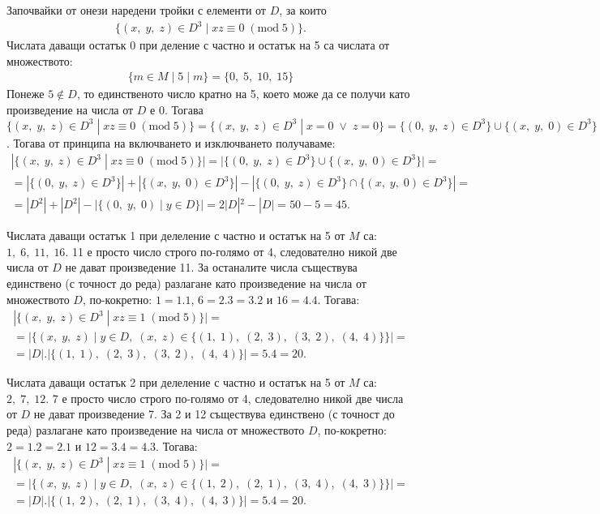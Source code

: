 \documentclass[a4paper, 12pt, oneside]{article}
\begin{document}
Започвайки от онези наредени тройки с елементи от $D$, за които
\begin{align*}
    \{(x, \; y, \; z) \in D^3 \; | \; xz \equiv 0 \; (\mathrm{mod} \; 5)\}.
\end{align*}
Числата даващи остатък 0 при деление с частно и остатък на 5 са числата от множеството:
\begin{align*}
    \{m \in M \; | \; 5 \mid m \} = \{0, \; 5, \; 10, \; 15\}
\end{align*}
Понеже $5 \notin D$, то единственото число кратно на 5, което може да се получи като произведение на числа от $D$ е 0.
Тогава
$\{(x, \; y, \; z) \in D^3 \; | \; xz \equiv 0 \; (\mathrm{mod} \; 5)\}
= \{(x, \; y, \; z) \in D^3 \; | \; x = 0 \; \lor \; z = 0 \} = \{(0, \; y, \; z) \in D^3\} \cup \{(x, \; y, \; 0) \in D^3\}$.
Тогава от принципа на включването и изключването получаваме:
\begin{align*}
|\{(x, \; y, \; z) \in D^3 \; | \; xz \equiv 0 \; (\mathrm{mod} \; 5)\}| = |\{(0, \; y, \; z) \in D^3\} \cup \{(x, \; y, \; 0) \in D^3\}| = \\
= |\{(0, \; y, \; z) \in D^3\}| + |\{(x, \; y, \; 0) \in D^3\}| - |\{(0, \; y, \; z) \in D^3\} \cap \{(x, \; y, \; 0) \in D^3\}| = \\
= |D^2| + |D^2| - |\{(0, \; y, \; 0) \; | \; y \in D\}| = 2 |D|^2 - |D| = 50 - 5 = 45.
\end{align*}

Числата даващи остатък 1 при делеление с частно и остатък на 5 от $M$ са: $1, \; 6, \; 11, \; 16$.
11 е просто число строго по-голямо от 4, следователно никой две числа от $D$ не дават произведение 11.
За останалите числа съществува единствено (с точност до реда) разлагане като произведение на числа от множеството $D$,
по-кокретно: $1 = 1.1$, $6 = 2.3 = 3.2$ и $16 = 4.4$. Тогава:
\begin{align*}
    |\{(x, \; y, \; z) \in D^3 \; | \; xz \equiv 1 \; (\mathrm{mod} \; 5)\}| = \\
    = |\{(x, \; y, \; z) \; | \; y \in D, \; (x, \; z) \in \{(1, \; 1), \; (2, \; 3), \; (3, \; 2), \; (4, \; 4)\}\}| = \\
    = |D|.|\{(1, \; 1), \; (2, \; 3), \; (3, \; 2), \; (4, \; 4)\}| = 5.4 = 20.
\end{align*}

Числата даващи остатък 2 при делеление с частно и остатък на 5 от $M$ са: $2, \; 7, \; 12$.
7 е просто число строго по-голямо от 4, следователно никой две числа от $D$ не дават произведение 7.
За 2 и 12 съществува единствено (с точност до реда) разлагане като произведение на числа от множеството $D$,
по-кокретно: $2 = 1.2 = 2.1$ и $12 = 3.4 = 4.3$. Тогава:
\begin{align*}
    |\{(x, \; y, \; z) \in D^3 \; | \; xz \equiv 1 \; (\mathrm{mod} \; 5)\}| = \\
    = |\{(x, \; y, \; z) \; | \; y \in D, \; (x, \; z) \in \{(1, \; 2), \; (2, \; 1), \; (3, \; 4), \; (4, \; 3)\}\}| = \\
    = |D|.|\{(1, \; 2), \; (2, \; 1), \; (3, \; 4), \; (4, \; 3)\}| = 5.4 = 20.
\end{align*}
\end{document}
